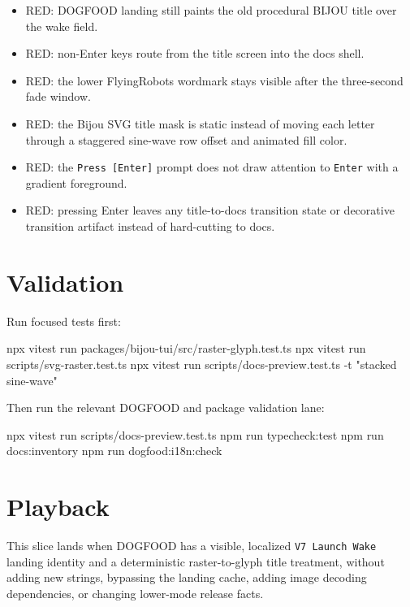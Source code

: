 \begin{itemize}
\item
  RED: DOGFOOD landing still paints the old procedural BIJOU title over the wake field.
\item
  RED: non-Enter keys route from the title screen into the docs shell.
\item
  RED: the lower FlyingRobots wordmark stays visible after the three-second fade window.
\item
  RED: the Bijou SVG title mask is static instead of moving each letter through a staggered sine-wave row offset and animated fill color.
\item
  RED: the \texttt{P\allowbreak{}r\allowbreak{}e\allowbreak{}s\allowbreak{}s\allowbreak{} \allowbreak{}[\allowbreak{}E\allowbreak{}n\allowbreak{}t\allowbreak{}e\allowbreak{}r\allowbreak{}]} prompt does not draw attention to \texttt{E\allowbreak{}n\allowbreak{}t\allowbreak{}e\allowbreak{}r} with a gradient foreground.
\item
  RED: pressing Enter leaves any title-to-docs transition state or decorative transition artifact instead of hard-cutting to docs.
\end{itemize}

\section{Validation}\label{record-113-validation}

Run focused tests first:

\begin{CodeBlock}
npx vitest run packages/bijou-tui/src/raster-glyph.test.ts
npx vitest run scripts/svg-raster.test.ts
npx vitest run scripts/docs-preview.test.ts -t "stacked sine-wave"
\end{CodeBlock}

Then run the relevant DOGFOOD and package validation lane:

\begin{CodeBlock}
npx vitest run scripts/docs-preview.test.ts
npm run typecheck:test
npm run docs:inventory
npm run dogfood:i18n:check
\end{CodeBlock}

\section{Playback}\label{record-113-playback}

This slice lands when DOGFOOD has a visible, localized \texttt{V\allowbreak{}7\allowbreak{} \allowbreak{}L\allowbreak{}a\allowbreak{}u\allowbreak{}n\allowbreak{}c\allowbreak{}h\allowbreak{} \allowbreak{}W\allowbreak{}a\allowbreak{}k\allowbreak{}e} landing identity and a deterministic raster-to-glyph title treatment, without adding new strings, bypassing the landing cache, adding image decoding dependencies, or changing lower-mode release facts.


